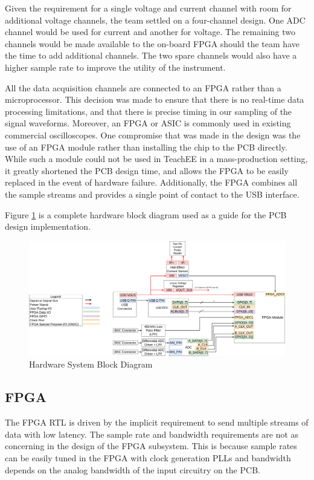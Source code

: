 \documentclass[letterpaper,11pt]{article}
\begin{document}
Given the requirement for a single voltage and current channel with room for
additional voltage channels, the team settled on a four-channel design. One ADC
channel would be used for current and another for voltage. The remaining two
channels would be made available to the on-board FPGA should the team have the
time to add additional channels. The two spare channels would also have a higher
sample rate to improve the utility of the instrument.

All the data acquisition channels are connected to an FPGA rather than a
microprocessor. This decision was made to ensure that there is no real-time data
processing limitations, and that there is precise timing in our sampling of the
signal waveforms. Moreover, an FPGA or ASIC is commonly used in existing
commercial oscilloscopes. One compromise that was made in the design was the use
of an FPGA module rather than installing the chip to the PCB directly. While
such a module could not be used in TeachEE in a mass-production setting, it
greatly shortened the PCB design time, and allows the FPGA to be easily replaced
in the event of hardware failure. Additionally, the FPGA combines all the sample
streams and provides a single point of contact to the USB interface.

Figure \ref{fig:hw-block-diagram} is a complete hardware block diagram used as a
guide for the PCB design implementation.

\begin{figure}[H]
  \centering
  \includegraphics[width=\textwidth]{../../misc/TeachEE-System-Diagram-Hardware.png}
  \caption{Hardware System Block Diagram}
  \label{fig:hw-block-diagram}
\end{figure}

\subsection{FPGA} %
The FPGA RTL is driven by the implicit requirement to send multiple streams of
data with low latency. The sample rate and bandwidth requirements are not as
concerning in the design of the FPGA subsystem. This is because sample rates can
be easily tuned in the FPGA with clock generation PLLs and bandwidth depends on
the analog bandwidth of the input circuitry on the PCB.
\end{document}

